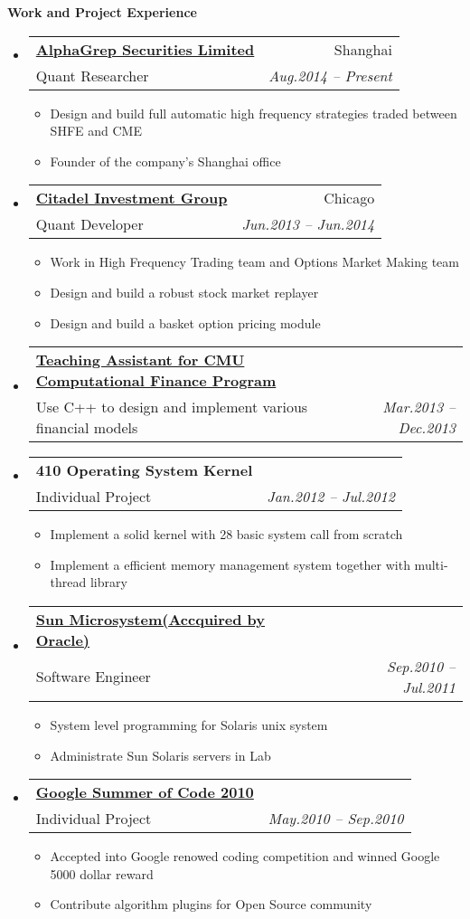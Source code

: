 \documentclass[letterpaper,11pt]{article}
\makeatletter
\newcommand{\resitem}[1]{\item #1 \vspace{-2pt}}
\newcommand{\resheading}[1]{{\large \colorbox{mygrey}{\begin{minipage}{\textwidth}{\textbf{#1 \vphantom{p\^{E}}}}\end{minipage}}}}
\newcommand{\ressubheading}[4]{
\begin{tabular*}{6.5in}{l@{\extracolsep{\fill}}r}
		\textbf{#1} & #2 \\
		{#3}{} & \textit{#4} \\
\end{tabular*}\vspace{-6pt}}
\makeatother
\begin{document}
\resheading{Work and Project Experience}
	\begin{itemize}
    \item
      \ressubheading{\href{http://www.citadel.com}
      {AlphaGrep Securities Limited}}{Shanghai}
      {Quant Researcher}{Aug.2014 -- Present}
      {\footnotesize
				\begin{itemize}
					\resitem{Design and build full automatic high frequency strategies traded between SHFE and CME}
          \resitem{Founder of the company's Shanghai office}
				\end{itemize}
			}
      
    \item
      \ressubheading{\href{http://www.citadel.com}
      {Citadel Investment Group}}{Chicago}
      {Quant Developer}{Jun.2013 -- Jun.2014}
      {\footnotesize
				\begin{itemize}
					\resitem{Work in High Frequency Trading team and 
          Options Market Making team}
          \resitem{Design and build a robust stock market replayer}
          \resitem{Design and build a basket option pricing module}
				\end{itemize}
			}

    \item 
			\ressubheading{
      \href{http://tepper.cmu.edu/master-in-computational-finance/index.aspx}
      {Teaching Assistant for CMU Computational Finance Program}}
      {}{Use C++ to design and implement various financial models}
      {Mar.2013 -- Dec.2013}
      
    \item 
			\ressubheading{410 Operating System Kernel}{}
      {Individual Project}{Jan.2012 -- Jul.2012}
      { \footnotesize
				\begin{itemize}
          \resitem{Implement a solid kernel with 28 basic system call from scratch}
					\resitem{Implement a efficient memory management system together with multi-thread library}
				\end{itemize}
			}

		\item 
			\ressubheading{\href{http://www.oracle.com/us/sun/index.html}
      {Sun Microsystem(Accquired by Oracle)}}{}
      {Software Engineer}
      {Sep.2010 -- Jul.2011}
      { \footnotesize
				\begin{itemize}
					\resitem{System level programming for Solaris unix system}
					\resitem{Administrate Sun Solaris servers in Lab}
				\end{itemize}
			}

		\item 
      \ressubheading{\href{http://code.google.com/soc/}{Google Summer of Code 2010}}{}{Individual Project}{May.2010 -- Sep.2010}
				{ \footnotesize
				\begin{itemize}
				  \resitem{Accepted into Google renowed coding competition and winned Google 5000 dollar reward}	
          \resitem{Contribute algorithm plugins for Open Source community}
				\end{itemize}
				}
	\end{itemize}
\end{document}
